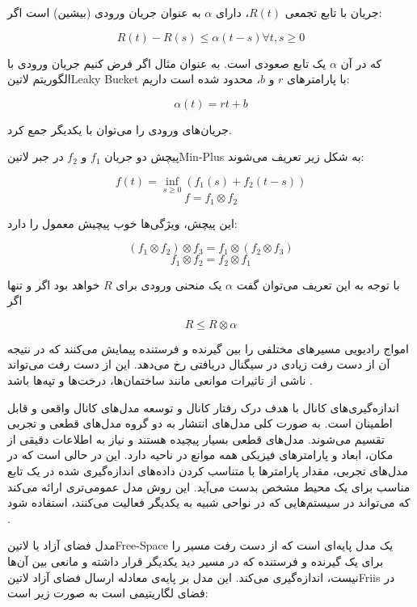
جریان با تابع تجمعی $R(t)$، دارای $\alpha$ به عنوان جریان ورودی (بیشین) است اگر:

\[
  R(t) - R(s) \le \alpha(t - s) \forall t,s \ge 0
\]

که در آن $\alpha$ یک تابع صعودی است. به عنوان مثال اگر فرض کنیم جریان ورودی با الگوریتم ‌لاتین{Leaky Bucket} با پارامترهای $r$ و $b$، محدود شده است داریم:

\[
  \alpha(t) = rt + b
\]

جریان‌های ورودی را می‌توان با یکدیگر جمع کرد.


پیچش دو جریان $f_{1}$ و $f_{2}$ در جبر ‌لاتین{Min-Plus} به شکل زیر تعریف می‌شوند:

\[
  f(t) = \inf_{s \ge 0}(f_{1}(s) + f_{2}(t-s))
\]
\[
  f = f_{1} \otimes f_{2}
\]

این پیچش، ویژگی‌ها خوب پیچیش معمول را دارد:

\[
  (f_{1} \otimes f_{2}) \otimes f_{3} = f_{1} \otimes (f_{2} \otimes f_{3})
\]
\[
  f_{1} \otimes f_{2} = f_{2} \otimes f_{1}
\]

با توجه به این تعریف می‌توان گفت $\alpha$ یک منحنی ورودی برای $R$ خواهد بود اگر و تنها اگر

\[
  R \le R \otimes \alpha
\]


امواج رادیویی مسیرهای مختلفی را بین گیرنده و فرستنده پیمایش می‌کنند که در نتیجه آن از دست رفت زیادی در سیگنال دریافتی رخ می‌دهد.
این از دست رفت می‌تواند ناشی از تاثیرات موانعی مانند ساختمان‌ها، درخت‌ها و تپه‌ها باشد
.

اندازه‌گیری‌های کانال با هدف درک رفتار کانال و توسعه مدل‌های کانال واقعی و قابل اطمینان است. به صورت کلی مدل‌های انتشار به دو گروه
مدل‌های قطعی و تجربی تقسیم می‌شوند. مدل‌های قطعی بسیار پیچیده هستند و نیاز به اطلاعات دقیقی از مکان، ابعاد و پارامترهای فیزیکی همه موانع
در ناحیه دارد. این در حالی است که در مدل‌های تجربی، مقدار پارامترها با متناسب کردن داده‌های اندازه‌گیری شده در یک تابع مناسب برای یک محیط
مشخص بدست می‌آید.
این روش مدل عمومی‌تری ارائه می‌کند که می‌تواند در سیستم‌هایی که در نواحی شبیه به یکدیگر فعالیت می‌کنند، استفاده شود
.


مدل فضای آزاد یا ‌لاتین{Free-Space} یک مدل پایه‌ای است که از دست رفت مسیر را برای یک گیرنده و فرستنده که در مسیر دید یکدیگر قرار داشته و مانعی بین آن‌ها
نیست، اندازه‌گیری می‌کند. این مدل بر پایه‌ی معادله ارسال فضای آزاد ‌لاتین{Friis} در فضای لگاریتیمی است به صورت زیر است:

